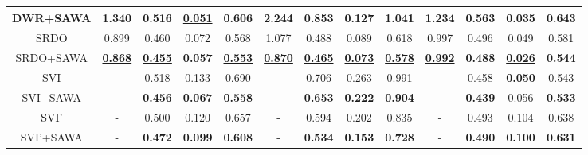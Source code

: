 \begin{table*}[!ht]
{\begin{tabular}{@{}ccccccccccccc@{}}
\multicolumn{1}{c|}{DWR+SAWA}  & \textbf{1.340}       & \textbf{0.516}       & {\ul \textbf{0.051}} & \multicolumn{1}{c|}{\textbf{0.606}}       & \textbf{2.244}       & \textbf{0.853}       & \textbf{0.127}       & \multicolumn{1}{c|}{\textbf{1.041}}       & \textbf{1.234}       & \textbf{0.563}       & \textbf{0.035}       & \textbf{0.643}       \\ \midrule
\multicolumn{1}{c|}{SRDO}      & 0.899                & 0.460                & 0.072                & \multicolumn{1}{c|}{0.568}                & 1.077                & 0.488                & 0.089                & \multicolumn{1}{c|}{0.618}                & 0.997                & 0.496                & 0.049                & 0.581                \\
\multicolumn{1}{c|}{SRDO+SAWA} & {\ul \textbf{0.868}} & {\ul \textbf{0.455}} & \textbf{0.057}       & \multicolumn{1}{c|}{{\ul \textbf{0.553}}} & {\ul \textbf{0.870}} & {\ul \textbf{0.465}} & {\ul \textbf{0.073}} & \multicolumn{1}{c|}{{\ul \textbf{0.578}}} & {\ul \textbf{0.992}} & \textbf{0.488}       & {\ul \textbf{0.026}} & \textbf{0.544}       \\ \midrule
\multicolumn{1}{c|}{SVI}       & -                    & 0.518                & 0.133                & \multicolumn{1}{c|}{0.690}                & -                    & 0.706                & 0.263                & \multicolumn{1}{c|}{0.991}                & -                    & 0.458                & \textbf{0.050}       & 0.543                \\
\multicolumn{1}{c|}{SVI+SAWA}  & -                    & \textbf{0.456}       & \textbf{0.067}       & \multicolumn{1}{c|}{\textbf{0.558}}       & -                    & \textbf{0.653}       & \textbf{0.222}       & \multicolumn{1}{c|}{\textbf{0.904}}       & -                    & {\ul \textbf{0.439}} & 0.056                & {\ul \textbf{0.533}} \\ \midrule
\multicolumn{1}{c|}{SVI'}      & -                    & 0.500                & 0.120                & \multicolumn{1}{c|}{0.657}                & -                    & 0.594                & 0.202                & \multicolumn{1}{c|}{0.835}                & -                    & 0.493                & 0.104                & 0.638                \\
\multicolumn{1}{c|}{SVI'+SAWA} & -                    & \textbf{0.472}       & \textbf{0.099}       & \multicolumn{1}{c|}{\textbf{0.608}}       & -                    & \textbf{0.534}       & \textbf{0.153}       & \multicolumn{1}{c|}{\textbf{0.728}}       & -                    & \textbf{0.490}       & \textbf{0.100}       & \textbf{0.631}       \\ \bottomrule

\end{tabular}}
\end{table*}
